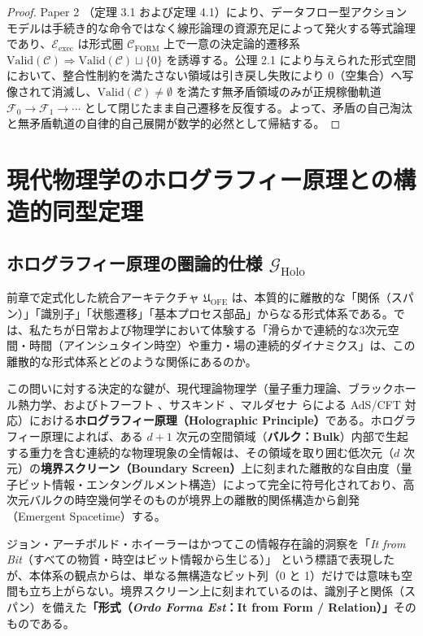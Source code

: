 \documentclass[11pt,a4paper]{ltjsarticle}
\theoremstyle{definition}
\theoremstyle{plain}
\begin{document}
\begin{proof}
Paper 2 \cite{Ota2026_2}（定理 3.1 および定理 4.1）により、データフロー型アクションモデルは手続き的な命令ではなく線形論理の資源充足によって発火する等式論理であり、$\mathcal{E}_{\mathrm{exec}}$ は形式圏 $\mathcal{C}_{\mathrm{FORM}}$ 上で一意の決定論的遷移系 $\mathrm{Valid}(\mathcal{C}) \Rightarrow \mathrm{Valid}(\mathcal{C}) \sqcup \{0\}$ を誘導する。公理 2.1 により与えられた形式空間において、整合性制約を満たさない領域は引き戻し失敗により $0$（空集合）へ写像されて消滅し、$\mathrm{Valid}(\mathcal{C}) \neq \emptyset$ を満たす無矛盾領域のみが正規稼働軌道 $\mathcal{F}_0 \to \mathcal{F}_1 \to \cdots$ として閉じたまま自己遷移を反復する。よって、矛盾の自己淘汰と無矛盾軌道の自律的自己展開が数学的必然として帰結する。
\end{proof}

\section{現代物理学のホログラフィー原理との構造的同型定理}

\subsection{ホログラフィー原理の圏論的仕様 $\mathcal{G}_{\mathrm{Holo}}$}
前章で定式化した統合アーキテクチャ $\mathfrak{U}_{\mathrm{OFE}}$ は、本質的に離散的な「関係（スパン）」「識別子」「状態遷移」「基本プロセス部品」からなる形式体系である。では、私たちが日常および物理学において体験する「滑らかで連続的な3次元空間・時間（アインシュタイン時空）や重力・場の連続的ダイナミクス」は、この離散的な形式体系とどのような関係にあるのか。

この問いに対する決定的な鍵が、現代理論物理学（量子重力理論、ブラックホール熱力学、およびトフーフト \cite{tHooft1993}、サスキンド \cite{Susskind1995}、マルダセナ \cite{Maldacena1998} らによる AdS/CFT 対応）における\textbf{ホログラフィー原理（Holographic Principle）}である。ホログラフィー原理によれば、ある $d+1$ 次元の空間領域（\textbf{バルク：Bulk}）内部で生起する重力を含む連続的な物理現象の全情報は、その領域を取り囲む低次元（$d$ 次元）の\textbf{境界スクリーン（Boundary Screen）}上に刻まれた離散的な自由度（量子ビット情報・エンタングルメント構造）によって完全に符号化されており、高次元バルクの時空幾何学そのものが境界上の離散的関係構造から創発（Emergent Spacetime）する。

ジョン・アーチボルド・ホイーラーはかつてこの情報存在論的洞察を「\textit{It from Bit}（すべての物質・時空はビット情報から生じる）」\cite{Wheeler1990} という標語で表現したが、本体系の観点からは、単なる無構造なビット列（0 と 1）だけでは意味も空間も立ち上がらない。境界スクリーン上に刻まれているのは、識別子と関係（スパン）を備えた\textbf{「形式（\textit{Ordo Forma Est}：It from Form / Relation）」}そのものである。
\end{document}
